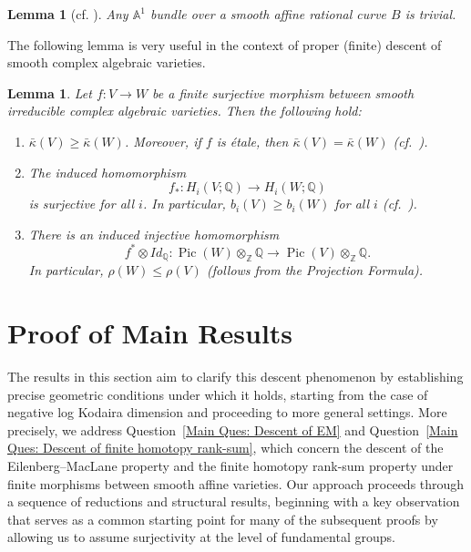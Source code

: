 \documentclass[12pt,reqno,twoside]{amsart}
\newtheorem{lemma}[theorem]{Lemma}
\theoremstyle{definition}
\numberwithin{equation}{section}
\newcommand{\A}{\mathbb{A}}
\newcommand{\Q}{\mathbb{Q}}
\newcommand{\Z}{\mathbb{Z}}
\newcommand{\Kbar}{\bar{\kappa}}
\newcommand{\Pic}{\operatorname{Pic}}
\begin{document}
\begin{lemma}[cf. {\cite[Lemma 2.14]{JSXZ2024}}]\label{Lem: A^1-bundle over affine rational curve is trivial}
	Any $\A^1$ bundle over a smooth affine rational curve $B$ is trivial.
\end{lemma}

The following lemma is very useful in the context of proper (finite) descent of smooth complex algebraic varieties. 
\begin{lemma}\label{Lem: Finite morphism basic properties}
Let $f \colon V \to W$ be a finite surjective morphism between smooth irreducible complex algebraic varieties. Then the following hold:
\begin{enumerate}[\indent \rm(1)]
    \item $\Kbar(V) \ge \Kbar(W)$. Moreover, if $f$ is {\'e}tale, then $\Kbar(V) = \Kbar(W)$ \textup{(cf.~\cite{Iit1982})}.
    
    \item The induced homomorphism 
    \[
    f_{*} \colon H_{i}(V; \Q) \longrightarrow H_{i}(W; \Q)
    \]
    is surjective for all $i$. In particular, $b_i(V) \ge b_i(W)$ for all $i$ \textup{(cf.~\cite{Gie1964})}.
    
    \item There is an induced injective homomorphism
    \[
    f^{*}\otimes Id_{\Q} \colon \Pic(W) \otimes_{\Z} \Q \longrightarrow \Pic(V) \otimes_{\Z} \Q.
    \]
    In particular, $\rho(W) \le \rho(V)$ \textup{(follows from the Projection Formula)}.
\end{enumerate}
\end{lemma}


\section{\bf Proof of Main Results}

The results in this section aim to clarify this descent phenomenon by establishing precise geometric conditions under which it holds, starting from the case of negative log Kodaira dimension and proceeding to more general settings. More precisely, we address Question~\ref{Main Ques: Descent of EM} and Question~\ref{Main Ques: Descent of finite homotopy rank-sum}, which concern the descent of the Eilenberg--MacLane property and the finite homotopy rank-sum property under finite morphisms between smooth affine varieties. Our approach proceeds through a sequence of reductions and structural results, beginning with a key observation that serves as a common starting point for many of the subsequent proofs by allowing us to assume surjectivity at the level of fundamental groups.
\end{document}

